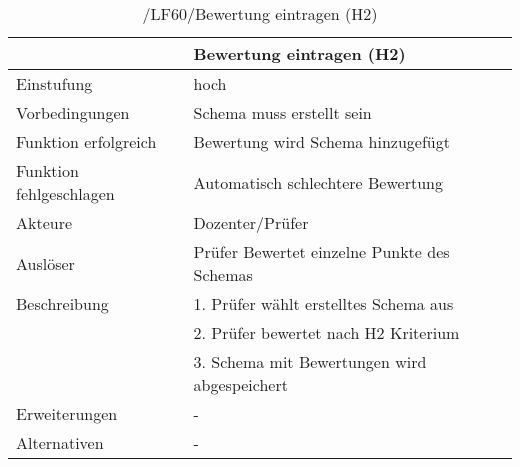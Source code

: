 	\begin{table}[H]
		\centering
		\caption{/LF60/Bewertung eintragen (H2)}
		\begin{tabularx}{\textwidth}{l|X}
			\toprule
			                        &                     Bewertung eintragen (H2) \\ \midrule
			             Einstufung &                                         hoch \\
			         Vorbedingungen &                    Schema muss erstellt sein \\
			   Funktion erfolgreich &            Bewertung wird Schema hinzugefügt \\
			Funktion fehlgeschlagen &            Automatisch schlechtere Bewertung \\
			                Akteure &                              Dozenter/Prüfer \\
			               Auslöser &  Prüfer Bewertet einzelne Punkte des Schemas \\
			           Beschreibung &        1. Prüfer wählt erstelltes Schema aus \\
			                        &         2. Prüfer bewertet nach H2 Kriterium \\
			                        & 3. Schema mit Bewertungen wird abgespeichert \\
			          Erweiterungen &                                            - \\
			           Alternativen &                                            - \\ \bottomrule
		\end{tabularx}%
		\label{tab:LF60eintrBew}%
	\end{table}%
	
